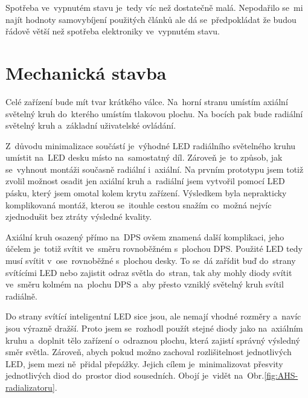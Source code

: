 Spotřeba ve~vypnutém stavu je~tedy víc než dostatečně malá.
Nepodařilo se~mi najít hodnoty samovybíjení použitých článků ale dá se~předpokládat že budou řádově větší než spotřeba elektroniky ve~vypnutém stavu.

\section{Mechanická stavba}
Celé zařízení bude mít tvar krátkého válce.
Na~horní stranu umístím axiální světelný kruh do~kterého umístím tlakovou plochu.
Na bocích pak bude radiální světelný kruh a~základní uživatelské ovládání.

Z~důvodu minimalizace součástí je~výhodné LED radiálního světelného kruhu umístit na~LED desku místo na~samostatný díl.
Zároveň je~to způsob, jak se~vyhnout montáži současně radiální i~axiální.
Na prvním prototypu jsem totiž zvolil možnost osadit jen axiální kruh a~radiální jsem vytvořil pomocí LED pásku, který jsem omotal kolem krytu zařízení.
Výsledkem byla neprakticky komplikovaná montáž, kterou se~itouhle cestou snažím co~možná nejvíc zjednodušit bez ztráty výsledné kvality.

Axiální kruh osazený přímo na~DPS ovšem znamená další komplikaci, jeho účelem je~totiž svítit ve~směru rovnoběžném s~plochou DPS.
Použité LED tedy musí svítit v~ose~rovnoběžné s~plochou desky.
To se~dá zařídit buď do~strany svítícími LED nebo zajistit odraz světla do~stran, tak aby mohly diody svítit ve~směru kolmém na~plochu DPS a~aby přesto vzniklý světelný kruh svítil radiálně.

Do strany svítící inteligentní LED sice jsou, ale nemají vhodné rozměry a~navíc jsou výrazně dražší.
Proto jsem se~rozhodl použít stejné diody jako na~axiálním kruhu a~doplnit tělo zařízení o~odraznou plochu, která zajistí správný výsledný směr světla.
Zároveň, abych pokud možno zachoval rozlišitelnost jednotlivých LED, jsem mezi ně~přidal přepážky.
Jejich cílem je~minimalizovat přesvity jednotlivých diod do~prostor diod sousedních.
Obojí je~vidět na~Obr.\ref{fig:AHS-radializatoru}.

